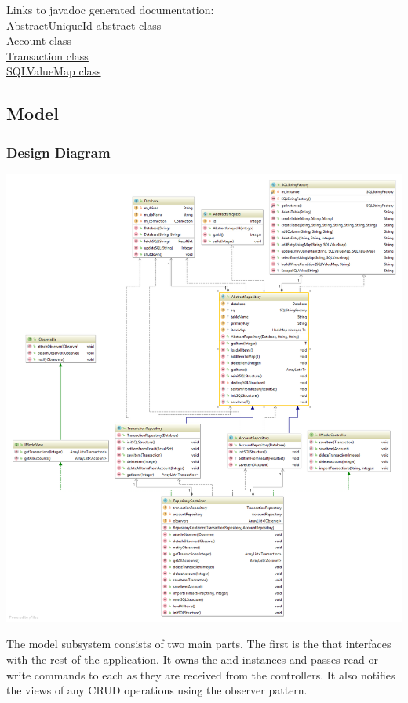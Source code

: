 \documentclass[12pt]{article}
\begin{document}
Links to javadoc generated documentation:\\
\href{run:javadoc/AbstractUniqueId.html}{AbstractUniqueId abstract class}\\
\href{run:javadoc/Account.html}{Account class}\\
\href{run:javadoc/Transaction.html}{Transaction class}\\
\href{run:javadoc/SQLValueMap.html}{SQLValueMap class}\\

\subsection{Model}

\subsubsection{Design Diagram}

\includegraphics[width=\textwidth,height=\textheight,keepaspectratio]{Diagrams/UML/Model.png}
\bigskip

\newpage
The model subsystem consists of two main parts. The first is the  that interfaces with the rest of the application. It owns the  and  instances and passes read or write commands to each as they are received from the controllers. It also notifies the views of any CRUD operations using the observer pattern.\\
\end{document}

